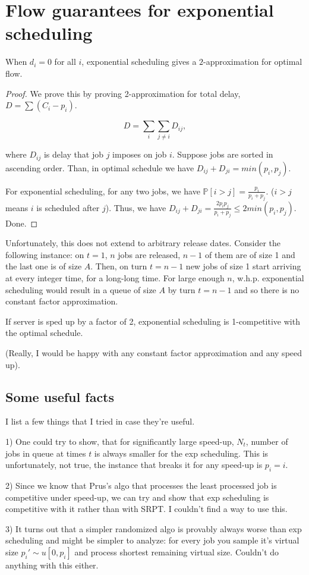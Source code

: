 \documentclass{article}
\def\PP{{\mathbb{P}}}
\begin{document}
\section{Flow guarantees for exponential scheduling}

\begin{theorem}
When $d_i = 0$ for all $i$, exponential scheduling gives a $2$-approximation for optimal flow.
\end{theorem}

\begin{proof}
We prove this by proving 2-approximation for total delay, $D=\sum (C_i-p_i)$.

$$D = \sum_i \sum_{j\neq i} D_{ij},$$

where $D_{ij}$ is delay that job $j$ imposes on job $i$. Suppose jobs are sorted in ascending order. Than, in optimal schedule we have $D_{ij} + D_{ji}= min(p_i,p_j)$.

For exponential scheduling, for any two jobs, we have $\PP[i>j] = \frac{p_i}{p_i+p_j}$. ($i>j$ means $i$ is scheduled after $j$). Thus, we have $D_{ij}+D_{ji} = \frac{2p_i p_j}{p_i + p_j} \leq 2 min(p_i,p_j)$. Done.
\end{proof}

Unfortunately, this does not extend to arbitrary release dates. Consider the following instance: on $t=1$, $n$ jobs are released, $n-1$ of them are of size 1 and the last one is of size $A$. Then, on turn $t = n-1$ new jobs of size 1 start arriving at every integer time, for a long-long time. For large enough $n$, w.h.p. exponential scheduling would result in a queue of size $A$ by turn $t = n-1$ and so there is no constant factor approximation.

\begin{conjecture}
If server is sped up by a factor of 2, exponential scheduling is 1-competitive with the optimal schedule.
\end{conjecture}

(Really, I would be happy with any constant factor approximation and any speed up).

\subsection{Some useful facts}

I list a few things that I tried in case they're useful.

1) One could try to show, that for significantly large speed-up, $N_t$, number of jobs in queue at times $t$ is always smaller for the exp scheduling. This is unfortunately, not true, the instance that breaks it for any speed-up is $p_i=i$.

2) Since we know that Prus's algo that processes the least processed job is competitive under speed-up, we can try and show that exp scheduling is competitive with it rather than with SRPT. I couldn't find a way to use this.

3) It turns out that a simpler randomized algo is provably always worse than exp scheduling and might be simpler to analyze: for every job you sample it's virtual size $p_i'\sim u[0,p_i]$ and process shortest remaining virtual size. Couldn't do anything with this either. 
\end{document}
